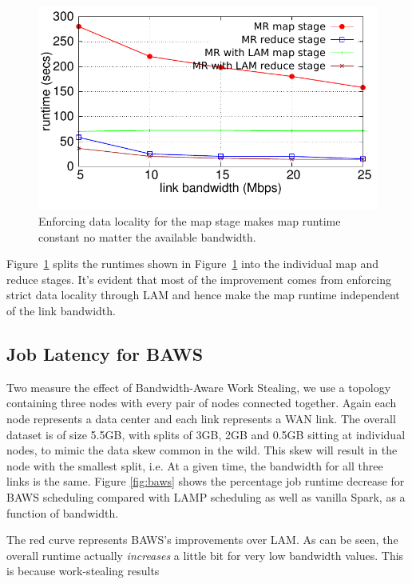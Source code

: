 \begin{figure}[!ht]
\centering\includegraphics[width=\columnwidth]{figs/stage-time-localMap.pdf}
\vspace{-1.2em}
\caption{Enforcing data locality for the map stage makes map runtime constant no matter the available bandwidth.}
\label{fig:stage-time-localMap}
\vspace{.7em}
\end{figure}

Figure~\ref{fig:stage-time-localMap} splits the runtimes shown in Figure~\ref{fig:stage-time-localMap} into the individual map and reduce stages. It's evident that most of the improvement comes from enforcing strict data locality through LAM and hence make the map runtime independent of the link bandwidth. 

\subsection{Job Latency for BAWS}

Two measure the effect of Bandwidth-Aware Work Stealing, we use a topology containing three nodes with every pair of nodes connected together. 
Again each node represents a data center and each link represents a WAN link. The overall dataset is of size 5.5GB, with splits of 3GB, 2GB and 0.5GB
sitting at individual nodes, to mimic the data skew common in the wild. This skew will result in the node with the smallest split, i.e.  At a given time, the bandwidth for all three links is the same.     
Figure \ref{fig:baws} shows the percentage job runtime decrease for BAWS scheduling compared with LAMP scheduling as well as vanilla Spark, 
as a function of bandwidth. 

The red curve represents BAWS's improvements over LAM. As can be seen, the overall runtime actually \emph{increases} a little bit for very low bandwidth values.
This is because work-stealing results  

